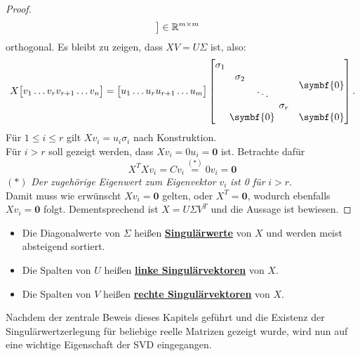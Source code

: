 \begin{proof}
\begin{equation*}
\begin{matrix}
        \end{matrix}
        \big]
        \in \mathbb{R}^{m \times m}
    \end{equation*}
    orthogonal.   
    Es bleibt zu  zeigen, dass \(XV = U\Sigma\) ist, also:
    \begin{equation*}
        X
        \big[
        \begin{matrix}
            v_1 \dots v_{r}v_{r+1} \dots v_n
        \end{matrix}
        \big]
        =
        \big[
        \begin{matrix}
            u_1 \dots u_{r}u_{r+1} \dots u_m
        \end{matrix}
        \big]
        \begin{bmatrix}
            \begin{matrix}
                \sigma_1 &  &  &  \\
                 & \sigma_2 &  & \\
                 &  &  \raisebox{-0.9ex}{\rotatebox{13}{\(\ddots\)}} &  \\
                 &  &  & \sigma_r
            \end{matrix} & \symbf{0} \\
            \symbf{0} & \symbf{0}
        \end{bmatrix}.
    \end{equation*}
    Für \(1 \leq i \leq r\) gilt \(Xv_i = u_i \sigma_i\) nach Konstruktion. \\
    Für \(i > r\) soll gezeigt werden, dass \(Xv_i = 0u_i  = \symbf{0}\) ist. 
    Betrachte dafür
    \begin{equation*}
        X^{T}Xv_i = Cv_i \overset{(*)}{=} 0v_i = \symbf{0}
    \end{equation*}
    {\small\((*)\) \textit{Der zugehörige Eigenwert zum Eigenvektor} \(v_i\) \textit{ist \num{0} für} \(i>r\).} 
    \vspace{5pt}
    \\
    Damit muss wie erwünscht \(Xv_i = \symbf{0}\) gelten, oder \(X^{T} = \symbf{0}\), wodurch ebenfalls \(Xv_i = \symbf{0}\) folgt.       
    Dementsprechend ist \(X = U \Sigma V^{T}\) und die Aussage ist bewiesen. 
\end{proof}
\begin{remark}\leavevmode
    \vspace{-14pt}
    \begin{itemize}
        \item Die Diagonalwerte von \(\Sigma\) heißen \textbf{\underline{Singulärwerte}} von \(X\) und werden meist absteigend sortiert. 
        \item Die Spalten von \(U\) heißen \textbf{\underline{linke Singulärvektoren}} von \(X\).
        \item Die Spalten von \(V\) heißen \textbf{\underline{rechte Singulärvektoren}} von \(X\). 
    \end{itemize}       
\end{remark}
Nachdem der zentrale Beweis dieses Kapitels geführt und die Existenz der Singulärwertzerlegung für beliebige reelle Matrizen gezeigt wurde, wird nun auf eine wichtige Eigenschaft der SVD eingegangen.

